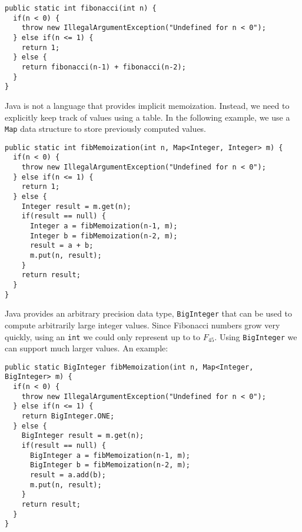 \begin{verbatim}
public static int fibonacci(int n) {
  if(n < 0) {
    throw new IllegalArgumentException("Undefined for n < 0");
  } else if(n <= 1) {
    return 1;
  } else {
    return fibonacci(n-1) + fibonacci(n-2);
  }
}
\end{verbatim}

Java is not a language that provides implicit memoization.  Instead, 
we need to explicitly keep track of values using a table.  In the 
following example, we use a \texttt{Map} data structure
to store previously computed values.

\begin{verbatim}
public static int fibMemoization(int n, Map<Integer, Integer> m) {
  if(n < 0) {
    throw new IllegalArgumentException("Undefined for n < 0");
  } else if(n <= 1) {
    return 1;
  } else {
    Integer result = m.get(n);
    if(result == null) {
      Integer a = fibMemoization(n-1, m);
      Integer b = fibMemoization(n-2, m);
      result = a + b;
      m.put(n, result);
    }
    return result;
  }
}
\end{verbatim}

Java provides an arbitrary precision data type, \texttt{BigInteger}
that can be used to compute arbitrarily large integer values.  Since
Fibonacci numbers grow very quickly, using an \texttt{int} we could
only represent up to to $F_{45}$.  Using \texttt{BigInteger} we
can support much larger values.  An example:

\begin{verbatim}
public static BigInteger fibMemoization(int n, Map<Integer, BigInteger> m) {
  if(n < 0) {
    throw new IllegalArgumentException("Undefined for n < 0");
  } else if(n <= 1) {
    return BigInteger.ONE;
  } else {
    BigInteger result = m.get(n);
    if(result == null) {
      BigInteger a = fibMemoization(n-1, m);
      BigInteger b = fibMemoization(n-2, m);
      result = a.add(b);
      m.put(n, result);
    }
    return result;
  }
}  
\end{verbatim}





